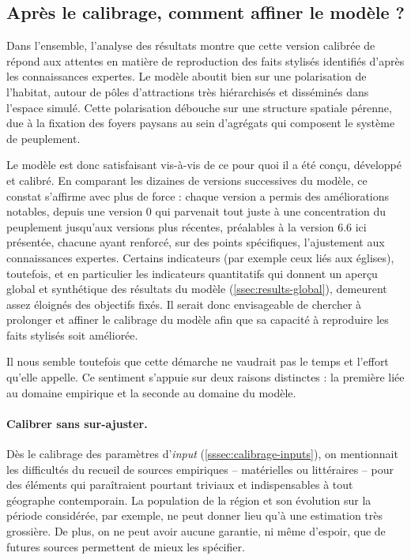 \subsection{Après le calibrage, comment affiner le modèle ? \label{subsec:depasser-calibrage}}

Dans l'ensemble, l'analyse des résultats montre que cette version calibrée de \simfeodal{} répond aux attentes en matière de reproduction des faits stylisés identifiés d'après les connaissances expertes.
Le modèle aboutit bien sur une polarisation de l'habitat, autour de pôles d'attractions très hiérarchisés et disséminés dans l'espace simulé.
Cette polarisation débouche sur une structure spatiale pérenne, due à la fixation des foyers paysans au sein d'agrégats qui composent le système de peuplement.

Le modèle \simfeodal{} est donc satisfaisant vis-à-vis de ce pour quoi il a été conçu, développé et calibré.
En comparant les dizaines de versions successives du modèle, ce constat s'affirme avec plus de force : chaque version a permis des améliorations notables, depuis une version 0 qui parvenait tout juste à une concentration du peuplement jusqu'aux versions plus récentes, préalables à la version 6.6 ici présentée, chacune ayant renforcé, sur des points spécifiques, l'ajustement aux connaissances expertes.
Certains indicateurs (par exemple ceux liés aux églises), toutefois, et en particulier les indicateurs quantitatifs qui donnent un aperçu global et synthétique des résultats du modèle (\cref{ssec:results-global}), demeurent assez éloignés des objectifs fixés.
Il serait donc envisageable de chercher à prolonger et affiner le calibrage du modèle afin que sa capacité à reproduire les faits stylisés soit améliorée.

Il nous semble toutefois que cette démarche ne vaudrait pas le temps et l'effort qu'elle appelle.
Ce sentiment s'appuie sur deux raisons distinctes : la première liée au domaine empirique et la seconde au domaine du modèle.

\paragraph{Calibrer sans sur-ajuster.}
Dès le calibrage des paramètres d'\textit{input} (\cref{sssec:calibrage-inputs}), on mentionnait les difficultés du recueil de sources empiriques -- matérielles ou littéraires -- pour des éléments qui paraîtraient pourtant triviaux et indispensables à tout géographe contemporain.
La population de la région et son évolution sur la période considérée, par exemple, ne peut donner lieu qu'à une estimation très grossière.
De plus, on ne peut avoir aucune garantie, ni même d'espoir, que de futures sources permettent de mieux les spécifier.


